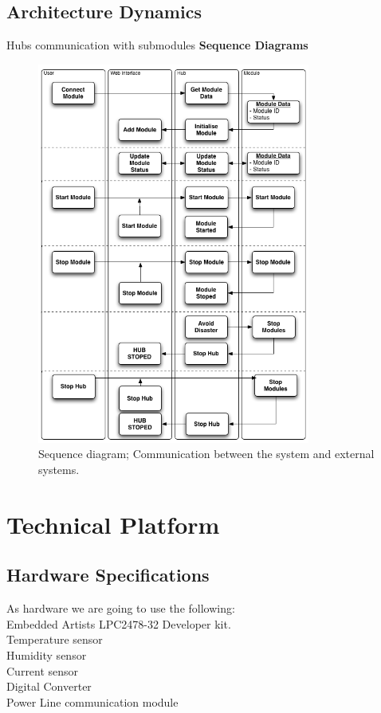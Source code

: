 	\subsection{Architecture Dynamics}
		Hubs communication with submodules
		\textbf{Sequence Diagrams}
		\begin{figure}[H]
			\begin{centering}
				 \includegraphics[width=0.8\textwidth]{images/SequenceDiagram.png}
				\caption{Sequence diagram; Communication between the system and external systems.}
		 	\end{centering}
		\end{figure}	
\section{Technical Platform}

	\subsection{Hardware Specifications}
	As hardware we are going to use the following: 
	\\Embedded Artists LPC2478-32 Developer kit.
	\\Temperature sensor
	\\Humidity sensor
	\\Current sensor
	\\Digital Converter
	\\Power Line communication module
